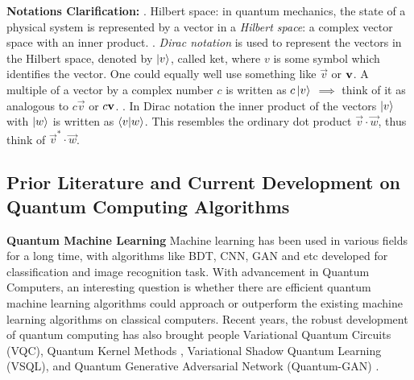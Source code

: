 \documentclass{article}
\begin{document}
\textbf{Notations Clarification: }. Hilbert space: in quantum mechanics, 
the state of a physical system is represented by a vector in 
a \textit{Hilbert space}: a complex vector space with an inner product. . \textit{Dirac notation} is used to represent the vectors in the 
Hilbert space, denoted by $\ket{v}$, called ket, where $v$ is 
some symbol which identifies the vector. One could equally well 
use something like $\overrightarrow{v}$ or $\text{\textbf{v}}$. A 
multiple of a vector by a complex number $c$ is written as 
$c\ket{v}$ $\implies$ think of it as analogous to $c \overrightarrow{v}$ 
or $c \text{\textbf{v}}$. . In Dirac notation the inner 
product of the vectors $\ket{v}$ with $\ket{w}$ is written as $\braket{v}{w}$. 
This resembles the ordinary dot product $\overrightarrow{v} \cdot \overrightarrow{w}$, 
thus think of $\overrightarrow{v}^{*} \cdot \overrightarrow{w}$.

\subsection{Prior Literature and Current Development on Quantum Computing Algorithms}

\textbf{Quantum Machine Learning} Machine learning has been used in various fields for a long time, 
with algorithms like BDT, CNN, GAN and etc developed for classification and image recognition task. 
With advancement in Quantum Computers, an interesting question is whether there are efficient 
quantum machine learning algorithms could approach or outperform the 
existing machine learning algorithms on classical computers.
Recent years, the robust development of quantum computing has also brought people 
Variational Quantum Circuits (VQC), Quantum Kernel Methods \cite{qml_kernel} \cite{qml_kernel2}, 
Variational Shadow Quantum Learning (VSQL)\cite{qml_vsql}, and Quantum Generative 
Adversarial Network (Quantum-GAN) \cite{qc_qgan}. 
\end{document}
